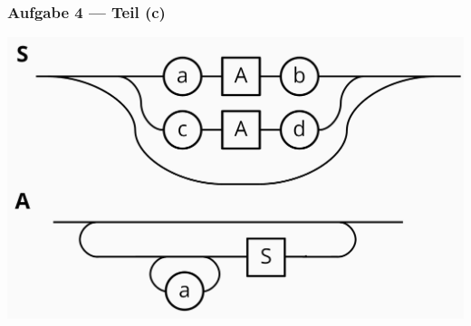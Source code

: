 \documentclass{beamer}
\begin{document}
\begin{frame} \frametitle{Aufgabe 4 --- Teil (c)}
	\centering
	\includegraphics[width=\textwidth]{tut03_syntax_dia_4c.jpg}
\end{frame}
\end{document}
